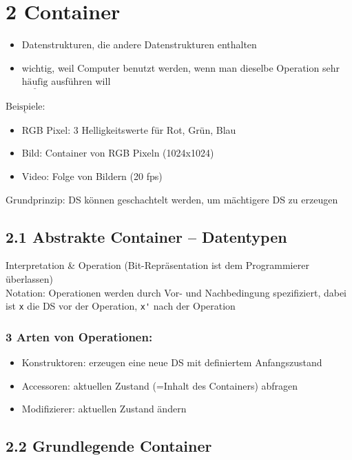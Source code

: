 \documentclass[11pt, fleqn]{scrreprt}
\begin{document}
\chapter*{2 Container}
\begin{itemize}[label={-}]
	\item Datenstrukturen, die andere Datenstrukturen enthalten
	\item wichtig, weil Computer benutzt werden, wenn man dieselbe Operation sehr $\underline{\text{häufig}}$ ausführen will
\end{itemize}
$\underline{\text{Beispiele:}}$ 
\begin{itemize}[label={-}]
	\item RGB Pixel: 3 Helligkeitswerte für Rot, Grün, Blau
	\item Bild: Container von RGB Pixeln (1024x1024)
	\item Video: Folge von Bildern (20 fps)
\end{itemize}
Grundprinzip: DS können geschachtelt werden, um mächtigere DS zu erzeugen



\section*{2.1 Abstrakte Container – Datentypen}

Interpretation \& Operation (Bit-Repräsentation ist dem Programmierer überlassen) \\

Notation: Operationen werden durch Vor- und Nachbedingung spezifiziert, dabei ist \verb|x| die DS vor der Operation, \verb|x'| nach der Operation \\

\subsection*{3 Arten von Operationen: }
\begin{itemize}[label={-}]
	\item Konstruktoren: erzeugen eine neue DS mit definiertem Anfangszustand
	\item Accessoren: aktuellen Zustand (=Inhalt des Containers) abfragen
	\item Modifizierer: aktuellen Zustand ändern
\end{itemize}


\section*{2.2 Grundlegende Container}
\end{document}
